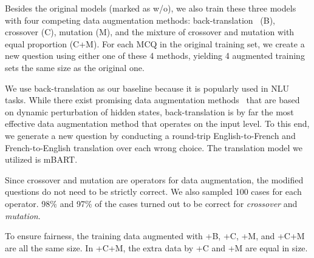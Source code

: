 %
%
%
Besides the original models (marked as w/o), we also train these three
models with four competing data augmentation methods: 
back-translation~\cite{back2019} (B),  crossover (C), mutation (M),
and the mixture of crossover and mutation with equal proportion (C+M). 
For each MCQ in the original training set, we create a new question using either one of
these 4 methods, yielding 4 augmented training sets the same size
as the original one.

We use back-translation as our baseline because it is
popularly used in NLU tasks. While there exist promising data augmentation 
methods~\cite{qu2020coda,chen-etal-2021-hiddencut} that are based on dynamic perturbation of 
hidden states, back-translation is by far the most
effective data augmentation method that operates on the input level.
To this end, we generate a new question by conducting a round-trip English-to-French and 
French-to-English translation over each wrong choice. The translation model we utilized is mBART. 

Since crossover and mutation are operators for data augmentation, 
the modified questions do not need to be strictly correct. 
We also sampled 100 cases for each operator. 98\% and 97\% of the cases turned out
to be correct for \textit{crossover} and \textit{mutation}. 

To ensure fairness, the training data augmented with +B, +C, +M, and +C+M are
all the same size. In +C+M, the extra data by +C and +M are equal in size. 

\iffalse

